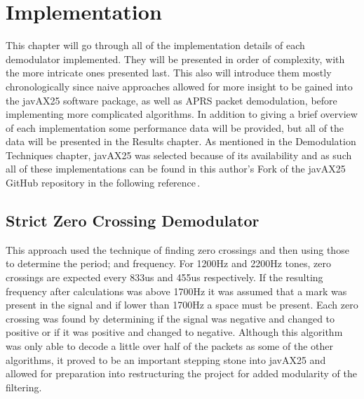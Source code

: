 \chapter{Implementation}

This chapter will go through all of the implementation details of each demodulator implemented. They will be presented in order of complexity, with the more intricate ones presented last. This also will introduce them mostly chronologically since naive approaches allowed for more insight to be gained into the javAX25 software package, as well as APRS packet demodulation, before implementing more complicated algorithms. In addition to giving a brief overview of each implementation some performance data will be provided, but all of the data will be presented in the Results chapter. As mentioned in the Demodulation Techniques chapter, javAX25 was selected because of its availability and as such all of these implementations can be found in this author's Fork of the javAX25 GitHub repository in the following reference\,\cite{myJavAX25}. 

\section{Strict Zero Crossing Demodulator}
This approach used the technique of finding zero crossings and then using those to determine the period; and frequency. For 1200Hz and 2200Hz tones, zero crossings are expected every 833us and 455us respectively. If the resulting frequency after calculations was above 1700Hz it was assumed that a mark was present in the signal and if lower than 1700Hz a space must be present. Each zero crossing was found by determining if the signal was negative and changed to positive or if it was positive and changed to negative. Although this algorithm was only able to decode a little over half of the packets as some of the other algorithms, it proved to be an important stepping stone into javAX25 and allowed for preparation into restructuring the project for added modularity of the filtering. 

